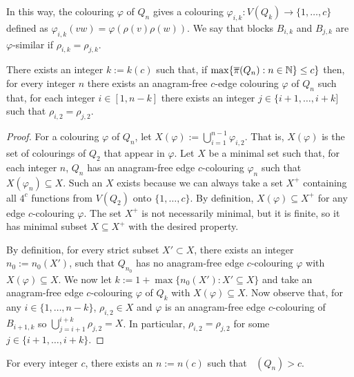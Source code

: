 \documentclass[kpfonts]{patmorin}
\DeclareMathOperator{\ci}{\overline{\pi}}
\begin{document}
In this way, the colouring $\varphi$ of $Q_n$ gives a colouring $\varphi_{i,k}:V(Q_k)\to\{1,\ldots,c\}$ defined as $\varphi_{i,k}(vw) = \varphi(\rho(v)\rho(w))$.  We say that blocks $B_{i,k}$ and $B_{j,k}$ are $\varphi$-similar if $\rho_{i,k}=\rho_{j,k}$.


\begin{lem}\label{periodicity}
    There exists an integer $k:=k(c)$ such that, if $\max\{\ci(Q_n): n\in\N\} \le c\}$ then, for every integer $n$ there exists an anagram-free $c$-edge colouring $\varphi$ of $Q_{n}$ such that, for each integer $i\in[1, n-k]$ there exists an integer $j\in\{ i+1,\ldots,i+k]$ such that $\rho_{i,2}=\rho_{j,2}$.
\end{lem}

\begin{proof}
    For a colouring $\varphi$ of $Q_n$, let $X(\varphi):=\bigcup_{i=1}^{n-1} \varphi_{i,2}$.  That is, $X(\varphi)$ is the set of colourings of $Q_2$ that appear in $\varphi$.  Let $X$ be a minimal set such that, for each integer $n$, $Q_n$ has an anagram-free edge $c$-colouring $\varphi_n$ such that $X(\varphi_n)\subseteq X$. Such an $X$ exists because we can always take a set $X^+$ containing all $4^c$ functions from $V(Q_2)$ onto $\{1,\ldots,c\}$.  By definition, $X(\varphi)\subseteq X^+$ for any edge $c$-colouring $\varphi$.  The set $X^+$ is not necessarily minimal, but it is finite, so it has minimal subset $X\subseteq X^+$ with the desired property.

    By definition, for every strict subset $X'\subset X$, there exists an integer $n_0:=n_0(X')$, such that $Q_{n_0}$ has no anagram-free edge $c$-colouring $\varphi$ with $X(\varphi)\subseteq X$. We now let $k:=1+\max\{n_0(X'):X'\subseteq X\}$ and take an anagram-free edge $c$-colouring $\varphi$ of $Q_k$ with $X(\varphi)\subseteq X$.  Now observe that, for any $i\in\{1,\ldots,n-k\}$, $\rho_{i,2}\in X$ and $\varphi$ is an anagram-free edge $c$-colouring of $B_{i+1,k}$ so $\bigcup_{j=i+1}^{i+k}\rho_{j,2}=X$.  In particular, $\rho_{i,2}=\rho_{j,2}$ for some $j\in\{i+1,\ldots,i+k\}$.
\end{proof}


\begin{thm}
    For every integer $c$, there exists an $n:=n(c)$ such that $\ci(Q_n)> c$.
\end{thm}
\end{document}
